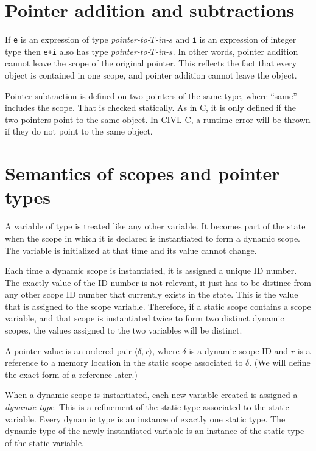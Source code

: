 \documentclass[11pt]{book}
\begin{document}
\section{Pointer addition and subtractions}

If \texttt{e} is an expression of type \emph{pointer-to-$T$-in-$s$}
and \texttt{i} is an expression of integer type then \texttt{e+i} also
has type \emph{pointer-to-$T$-in-$s$}.  In other words, pointer
addition cannot leave the scope of the original pointer.  This
reflects the fact that every object is contained in one scope, and
pointer addition cannot leave the object.


Pointer subtraction is defined on two pointers of the same type, where
``same'' includes the scope.  That is checked statically.  As in C, it
is only defined if the two pointers point to the same object.  In
CIVL-C, a runtime error will be thrown if they do not point to the
same object.

\section{Semantics of scopes and pointer types}

A variable of type \cscope{} is treated like any other variable.
It becomes part of the state when the scope in which it is declared
is instantiated to form a dynamic scope.  The variable is 
initialized  at that time and its value cannot change.

Each time a dynamic scope is instantiated, it is assigned a unique ID
number.  The exactly value of the ID number is not relevant, it just
has to be distince from any other scope ID number that currently
exists in the state.  This is the value that is assigned to the scope
variable.  Therefore, if a static scope contains a scope variable, and
that scope is instantiated twice to form two distinct dynamic scopes,
the values assigned to the two variables will be distinct.

A pointer value is an ordered pair $\langle \delta,r \rangle$, where
$\delta$ is a dynamic scope ID and $r$ is a reference to a memory
location in the static scope associated to $\delta$.  (We will define
the exact form of a reference later.)

When a dynamic scope is instantiated, each new variable created is
assigned a \emph{dynamic type}.  This is a refinement of the static
type associated to the static variable.   Every dynamic type
is an instance of exactly one static type.  The dynamic
type of the newly instantiated variable is an instance of the
static type of the static variable.
\end{document}
